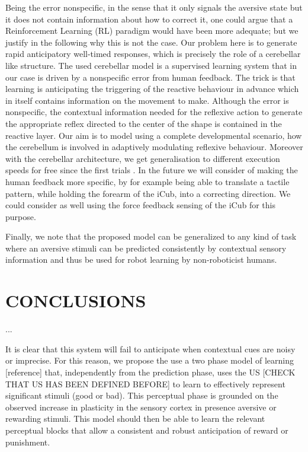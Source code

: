 \documentclass[letterpaper, 10 pt, conference]{ieeeconf}  %
\begin{document}
Being the error nonspecific, in the sense that it only signals the aversive state but it does not contain information about how to correct it, one could argue that a Reinforcement Learning (RL) paradigm would have been more adequate; but we justify in the following why this is not the case. Our problem here is to generate rapid anticipatory well-timed responses, which is precisely the role of a cerebellar like structure.
The used cerebellar model \cite{herreros2013nucleo} is a supervised learning system that in our case is driven by a nonspecific error from human feedback. The trick is that learning is anticipating the triggering of the reactive behaviour in advance which in itself contains information on the movement to make. Although the error is nonspecific, the contextual information needed for the reflexive action to generate the appropriate reflex directed to the center of the shape is contained in the reactive layer. Our aim is to model using a complete developmental scenario, how the cerebellum is involved in adaptively modulating reflexive behaviour. Moreover with the cerebellar architecture, we get generalisation to different execution speeds for free since the first trials \cite{herreros2013speed}.  
In the future we will consider of making the human feedback more specific, by for example being able to translate a tactile pattern, while holding the forearm of the iCub, into a correcting direction. We could consider as well using the force feedback sensing of the iCub for this purpose.

Finally, we note that the proposed model can be generalized to any kind of task where an aversive stimuli can be predicted consistently by contextual sensory information and thus be used for robot learning by non-roboticist humans.



\section{CONCLUSIONS}
\label{sec:conclusions}

...

It is clear that this system will fail to anticipate when contextual cues are noisy or imprecise. For this reason, we propose the use a two phase model of learning [reference] that, independently from the prediction phase, uses the US [CHECK THAT US HAS BEEN DEFINED BEFORE] to learn to effectively represent significant stimuli (good or bad). This perceptual phase is grounded on the observed increase in plasticity in the sensory cortex in presence aversive or rewarding stimuli. This model should then be able to learn the relevant perceptual blocks that allow a consistent and robust anticipation of reward or punishment. 
\end{document}

